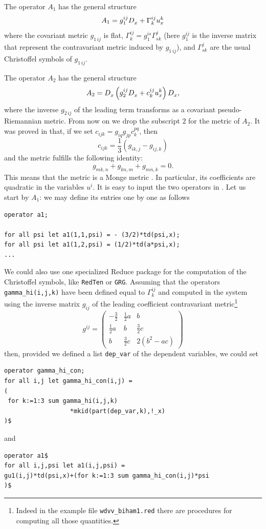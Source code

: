The operator $A_1$ has the general structure
\[
  A_1 = g_1^{ij}D_x^{} + \Gamma^{ij}_ku^k_x
\]
where the covariant metric $g_{1\,ij}$ is flat, $\Gamma^{ij}_k =
g_1^{is}\Gamma^j_{sk}$ (here $g_1^{ij}$ is the inverse matrix that represent
the contravariant metric induced by $g_{1\,ij}$), and $\Gamma^j_{sk}$ are the
usual Christoffel symbols of $g_{1\,ij}$.

The operator $A_2$ has the general structure
\begin{equation}
  A_2=D_x^{}\left(g^{ij}_2D_x^{}+c_{k}^{ij}u_{x}^{k}\right)D_x^{},  \label{casimir}
\end{equation}
where the inverse $g_{2\,ij}$ of the leading term transforms as a covariant
pseudo-Riemannian metric. From now on we drop the subscript $2$ for the metric
of $A_2$. It was proved in \cite{Ferapontov:2014} that, if we set
$c_{ijk}=g_{iq}g_{jp}c_{k}^{pq}$, then
\[
  c_{ijk}=\frac{1}{3}(g_{ik,j}-g_{ij,k})
\]
and the metric fulfills the following identity:
\begin{equation}
  g_{mk,n}+g_{kn,m}+g_{mn,k}=0.
  \label{Killing}
\end{equation}
This means that the metric is a Monge metric \cite{Ferapontov:2014}. In particular, its
coefficients are quadratic in the variables $u^i$.
It is easy to input the two operators in \cde. Let us start by $A_1$: we may
define its entries one by one as follows
\begin{verbatim}
operator a1;

for all psi let a1(1,1,psi) = - (3/2)*td(psi,x);
for all psi let a1(1,2,psi) = (1/2)*td(a*psi,x);
...
\end{verbatim}
We could also use one specialized Reduce package for the computation of the
Christoffel symbols, like \texttt{RedTen} or \texttt{GRG}. Assuming that the
operators \texttt{gamma\_hi(i,j,k)} have been defined equal to $\Gamma^{ij}_k$
and computed in the system using the inverse matrix $g_{ij}$ of the leading
coefficient contravariant metric\footnote{Indeed in the example file
  \texttt{wdvv\_biham1.red} there are procedures for computing all those
  quantities.}
\[
  g^{ij} =
  \begin{pmatrix}
    -\frac{3}{2} & \frac{1}{2}a & b
    \\
    \frac{1}{2}a & b & \frac{3}{2}c
    \\
    b & \frac{3}{2}c & 2(b^2-ac)
  \end{pmatrix}
\]
then, provided we defined a list \texttt{dep\_var} of the dependent variables,
we could set
\begin{verbatim}
operator gamma_hi_con;
for all i,j let gamma_hi_con(i,j) =
(
 for k:=1:3 sum gamma_hi(i,j,k)
                  *mkid(part(dep_var,k),!_x)
)$
\end{verbatim}
and
\begin{verbatim}
operator a1$
for all i,j,psi let a1(i,j,psi) =
gu1(i,j)*td(psi,x)+(for k:=1:3 sum gamma_hi_con(i,j)*psi
)$
\end{verbatim}

